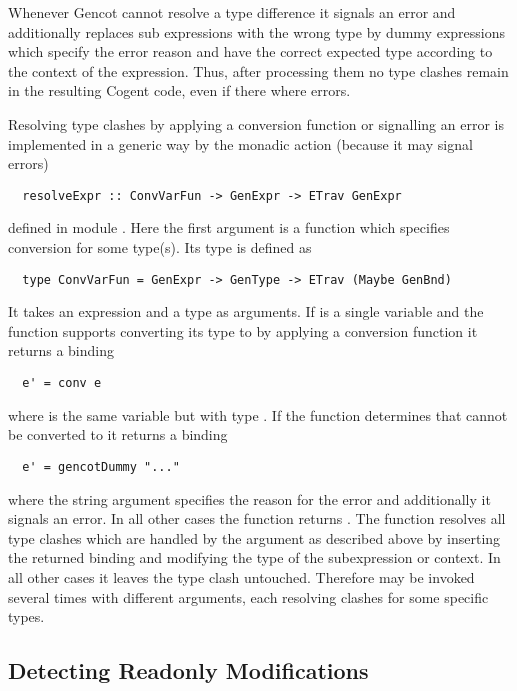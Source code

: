 Whenever Gencot cannot resolve a type difference it signals an error and additionally replaces sub expressions with the wrong type
by dummy expressions which specify the error reason and have the correct expected type according to the context of the expression.
Thus, after processing them no type clashes remain in the resulting Cogent code, even if there where errors.

Resolving type clashes by applying a conversion function or signalling an error is implemented in a generic way by the monadic
action (because it may signal errors)
\begin{verbatim}
  resolveExpr :: ConvVarFun -> GenExpr -> ETrav GenExpr
\end{verbatim}
defined in module . Here the first argument is a function which specifies conversion for
some type(s). Its type is defined as
\begin{verbatim}
  type ConvVarFun = GenExpr -> GenType -> ETrav (Maybe GenBnd)
\end{verbatim}
It takes an expression  and a type  as arguments. If  is a single variable  and the function supports
converting its type to  by applying a conversion function  it returns a binding
\begin{verbatim}
  e' = conv e
\end{verbatim}
where  is the same variable but with type . If the function determines that  cannot be converted to
 it returns a binding
\begin{verbatim}
  e' = gencotDummy "..."
\end{verbatim}
where the string argument specifies the reason for the error and additionally it signals an error. In all other cases the
function returns . The function  resolves all type clashes which are handled by the 
argument as described above by inserting the returned binding and modifying the type of the subexpression or context. In
all other cases it leaves the type clash untouched. Therefore  may be invoked several times with different
 arguments, each resolving clashes for some specific types.

\subsection{Detecting Readonly Modifications}
\label{impl-post-romod}

